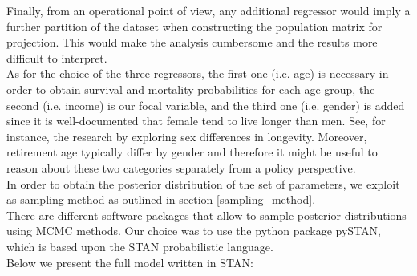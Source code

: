 Finally, from an operational point of view, any additional regressor would imply a further partition of the dataset when constructing the population matrix for projection. This would make the analysis cumbersome and the results more difficult to interpret. \\

As for the choice of the three regressors, the first one (i.e. age) is necessary in order to obtain survival and mortality probabilities for each age group, the second (i.e. income) is our focal variable, and the third one (i.e. gender) is added since it is well-documented that female tend to live longer than men. See, for instance, the research by \cite{Austad2006WhyLongevity} exploring sex differences in longevity. Moreover, retirement age typically differ by gender and therefore it might be useful to reason about these two categories separately from a policy perspective.\\

In order to obtain the posterior distribution of the set of parameters, we exploit as sampling method as outlined in section \ref{sampling_method}. \\
There are different software packages that allow to sample posterior distributions using MCMC methods. Our choice was to use the python package pySTAN, which is based upon the STAN probabilistic language.\\

Below we present the full model written in STAN:
\\

